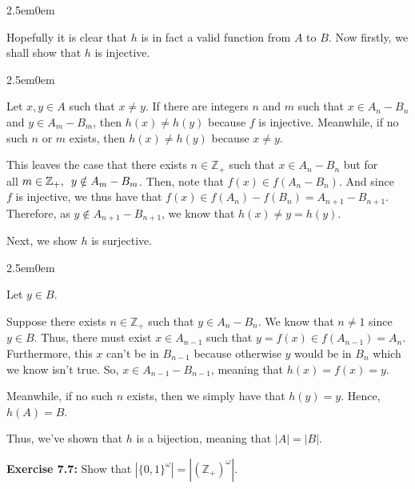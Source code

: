\documentclass{book}
\newcommand{\exP}{%
   \color{Purple}%
   \fontsize{12}{14}\selectfont%
}
\newenvironment{myIndent}{%
   \begin{adjustwidth}{2.5em}{0em}%
}{%
   \end{adjustwidth}%
}
\newcommand{\blab}[1]{\textbf{#1}}
\newcommand{\myHS}{ \hspace{0.5em}}
\newcommand{\retTwo}{\hfill\bigbreak}
\begin{document}
\begin{myIndent}
      Hopefully it is clear that $h$ is in fact a valid function from $A$ to $B$. Now firstly, we shall show that $h$ is injective.

      \begin{myIndent}\exP
         Let $x, y \in A$ such that $x \neq y$. If there are integers $n$ and $m$ such that $x \in A_n - B_n$ and $y \in A_m - B_m$, then $h(x) \neq h(y)$ because $f$ is injective. Meanwhile, if no such $n$ or $m$ exists, then $h(x) \neq h(y)$ because $x \neq y$.\retTwo

         This leaves the case that there exists $n \in \mathbb{Z}_+$ such that $x \in A_n - B_n$ but for\\ all $m \in \mathbb{Z}_+,\myHS y \notin A_m - B_m$. Then, note that $f(x) \in f(A_{n} - B_{n})$. And since\\ $f$ is injective, we thus have that $f(x) \in f(A_{n}) - f(B_{n}) = A_{n+1} - B_{n+1}$.\\ Therefore, as $y \notin A_{n+1} - B_{n+1}$, we know that $h(x) \neq y = h(y)$.\retTwo
      \end{myIndent}

      Next, we show $h$ is surjective.

      \begin{myIndent}\exP
         Let $y \in B$.\retTwo
         
         Suppose there exists $n \in \mathbb{Z}_+$ such that $y \in A_n - B_n$. We know that $n \neq 1$ since $y \in B$. Thus, there must exist $x \in A_{n-1}$ such that $y = f(x) \in f(A_{n-1}) = A_n$. Furthermore, this $x$ can't be in $B_{n-1}$ because otherwise $y$ would be in $B_n$ which we know isn't true. So, $x \in A_{n-1} - B_{n-1}$, meaning that $h(x) = f(x) = y$.\retTwo

         Meanwhile, if no such $n$ exists, then we simply have that $h(y) = y$. Hence,\\ $h(A) = B$.\retTwo
      \end{myIndent}

      Thus, we've shown that $h$ is a bijection, meaning that $|A| = |B|$.\newpage
   \end{myIndent}

   \blab{Exercise 7.7:} Show that $|\{0, 1\}^\omega| = |(\mathbb{Z}_+)^\omega|$.
\end{document}
